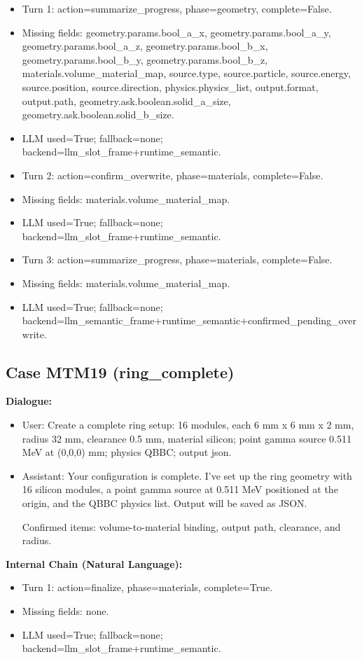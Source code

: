 \documentclass[11pt]{ctexart}
\begin{document}
\begin{itemize}
\item Turn 1: action=summarize\_progress, phase=geometry, complete=False.
\item Missing fields: geometry.params.bool\_a\_x, geometry.params.bool\_a\_y, geometry.params.bool\_a\_z, geometry.params.bool\_b\_x, geometry.params.bool\_b\_y, geometry.params.bool\_b\_z, materials.volume\_material\_map, source.type, source.particle, source.energy, source.position, source.direction, physics.physics\_list, output.format, output.path, geometry.ask.boolean.solid\_a\_size, geometry.ask.boolean.solid\_b\_size.
\item LLM used=True; fallback=none; backend=llm\_slot\_frame+runtime\_semantic.
\item Turn 2: action=confirm\_overwrite, phase=materials, complete=False.
\item Missing fields: materials.volume\_material\_map.
\item LLM used=True; fallback=none; backend=llm\_slot\_frame+runtime\_semantic.
\item Turn 3: action=summarize\_progress, phase=materials, complete=False.
\item Missing fields: materials.volume\_material\_map.
\item LLM used=True; fallback=none; backend=llm\_semantic\_frame+runtime\_semantic+confirmed\_pending\_overwrite.
\end{itemize}
\subsection{Case MTM19 (ring\_complete)}
\textbf{Dialogue:}
\begin{itemize}
\item User: Create a complete ring setup: 16 modules, each 6 mm x 6 mm x 2 mm, radius 32 mm, clearance 0.5 mm, material silicon; point gamma source 0.511 MeV at (0,0,0) mm; physics QBBC; output json.
\item Assistant: Your configuration is complete. I've set up the ring geometry with 16 silicon modules, a point gamma source at 0.511 MeV positioned at the origin, and the QBBC physics list. Output will be saved as JSON.

Confirmed items: volume-to-material binding, output path, clearance, and radius.
\end{itemize}
\textbf{Internal Chain (Natural Language):}
\begin{itemize}
\item Turn 1: action=finalize, phase=materials, complete=True.
\item Missing fields: none.
\item LLM used=True; fallback=none; backend=llm\_slot\_frame+runtime\_semantic.
\end{itemize}
\end{document}
